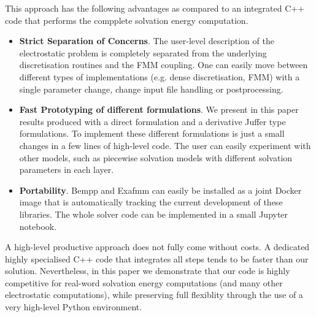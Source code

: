 This approach has the following advantages as compared to an integrated C++ code that performs the compplete solvation energy computation.
\begin{itemize}
	\item \textbf{Strict Separation of Concerns}. The user-level description of the electrostatic problem is completely separated from the underlying discretisation routines and the FMM coupling. One can easily move between different types of implementations (e.g. dense discretisation, FMM) with a single parameter change, change input file handling or postprocessing.
	\item \textbf{Fast Prototyping of different formulations}. We present in this paper results produced with a direct formulation and a derivative Juffer type formulations. To implement these different formulations is just a small changes in a few lines of high-level code. The user can easily experiment with other models, such as piecewise solvation models with different solvation parameters in each layer.
	\item \textbf{Portability}. Bempp and Exafmm can easily be installed as a joint Docker image that is automatically tracking the current development of these libraries. The whole solver code can be implemented in a small Jupyter notebook.
\end{itemize}
A high-level productive approach does not fully come without costs. A dedicated highly specialised C++ code that integrates all steps tends to be faster than our solution. Nevertheless, in this paper we demonstrate that our code is highly competitive for real-word solvation energy computations (and many other electrostatic computations), while preserving full flexiblity through the use of a very high-level Python environment.



